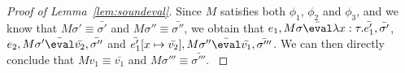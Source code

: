 \begin{proof}[Proof of Lemma~\ref{lem:soundeval}]
{  Since $M$ satisfies both $\phi_1$, $\phi_2$ and $\phi_3$, and we know that
  $M\sigma' \equiv\bar{\sigma'}$ and $M\sigma'' \equiv\bar{\sigma''}$,
  we obtain that $e_1,M\sigma \bar{\eval}\lambda x : \tau.\bar{e_1'},\bar{\sigma'}$, $e_2,M\sigma' \bar{\eval}\bar{v_2},\bar{\sigma''}$ and $\bar{e_1'}[x\mapsto \bar{v_2}],M\sigma'' \bar{\eval}\bar{v_1},\bar{\sigma'''}$.
  We can then directly conclude that $M v_1 \equiv \bar{v_1}$ and $M\sigma'''\equiv\bar{\sigma'''}$.
  }

   {


  }


\end{proof}
